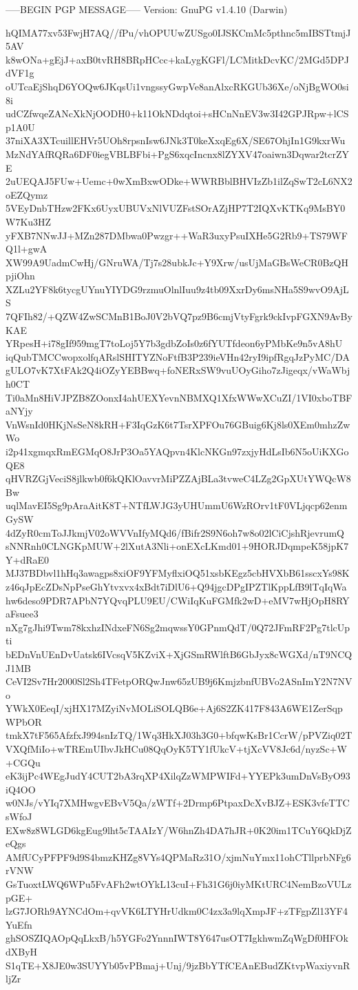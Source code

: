 -----BEGIN PGP MESSAGE-----
Version: GnuPG v1.4.10 (Darwin)

hQIMA77xv53FwjH7AQ//fPu/vhOPUUwZUSgo0IJSKCmMc5pthnc5mIBSTtmjJ5AV
k8wONa+gEjJ+axB0tvRH8BRpHCcc+kaLygKGFl/LCMitkDcvKC/2MGd5DPJdVF1g
oUTcaEjShqD6YOQw6JKqsUi1vngssyGwpVe8anAlxcRKGUb36Xe/oNjBgWO0si8i
udCZfwqeZANcXkNjOODH0+k11OkNDdqtoi+sHCnNnEV3w3I42GPJRpw+lCSp1A0U
37niXA3XTcuillEHVr5UOh8rpsnIsw6JNk3T0keXxqEg6X/SE67OhjIn1G9kxrWu
MzNdYAfRQRa6DF0iegVBLBFbi+PgS6xqcIncnx8lZYXV47oaiwn3Dqwar2tcrZYE
2uUEQAJ5FUw+Uemc+0wXmBxwODke+WWRBblBHVIzZb1ilZqSwT2cL6NX2oEZQymz
5VEyDnbTHzw2FKx6UyxUBUVxNlVUZFstSOrAZjHP7T2IQXvKTKq9MsBY0W7Ku3HZ
yFXB7NNwJJ+MZn287DMbwa0Pwzgr++WaR3uxyPsuIXHe5G2Rb9+TS79WFQ1l+gwA
XW99A9UadmCwHj/GNruWA/Tj7s28ubkJc+Y9Xrw/usUjMaGBsWeCR0BzQHpjiOhn
XZLu2YF8k6tycgUYnuYIYDG9rzmuOlnlIuu9z4tb09XxrDy6msNHa5S9wvO9AjLS
7QFIh82/+QZW4ZwSCMnB1BoJ0V2bVQ7pz9B6cmjVtyFgrk9ckIvpFGXN9AvByKAE
YRpesH+i78gIf959mgT7toLoj5Y7b3gdbZoIs0z6fYUTfdeon6yPMbKe9n5vA8hU
iqQubTMCCwopxolfqARslSHITYZNoFtfB3P239ieVHn42ryI9ipfRgqJzPyMC/DA
gULO7vK7XtFAk2Q4iOZyYEBBwq+foNERxSW9vuUOyGiho7zJigeqx/vWaWbjh0CT
Ti0aMn8HiVJPZB8ZOonxI4ahUEXYevnNBMXQ1XfxWWwXCuZI/1VI0xboTBFaNYjy
VnWsnId0HKjNsSeN8kRH+F3IqGzK6t7TsrXPFOu76GBuig6Kj8ls0XEm0mhzZwWo
i2p41xgmqxRmEGMqO8JrP3Oa5YAQpvn4KlcNKGn97zxjyHdLsIb6N5oUiKXGoQE8
qHVRZGjVeciS8jlkwb0f6kQKlOavvrMiPZZAjBLa3tvweC4LZg2GpXUtYWQcW8Bw
uqlMavEI5Sg9pAraAitK8T+NTfLWJG3yUHUmmU6WzROrv1tF0VLjqcp62enmGySW
4dZyR0cmToJJkmjV02oWVVnIfyMQd6/fBifr2S9N6oh7w8o02lCiCjshRjevrumQ
sNNRnh0CLNGKpMUW+2lXutA3Nli+onEXcLKmd01+9HORJDqmpeK58jpK7Y+dRaE0
MJ37BDbvl1hHq3awagps8xiOF9YFMyflxiOQ51xsbKEgz5cbHVXbB61sscxYs98K
z46qJpEcZDsNpPseGhYtvxvx4xBdt7iDlU6+Q94jgcDPgIPZTlKppLfB9lTqIqWa
hw6deso9PDR7APbN7YQvqPLU9EU/CWiIqKuFGMfk2wD+eMV7wHjOpH8RYaFsuee3
nXg7gJhi9Twm78kxhzINdxeFN6Sg2mqwssY0GPnmQdT/0Q72JFmRF2Pg7tlcUpti
bEDnVnUEnDvUatsk6IVcsqV5KZviX+XjGSmRWlftB6GbJyx8cWGXd/nT9NCQJ1MB
CeVI2Sv7Hr2000Sl2Sh4TFetpORQwJnw65zUB9j6KmjzbnfUBVo2ASnImY2N7NVo
YWkX0EeqI/xjHX17MZyiNvMOLiSOLQB6e+Aj6S2ZK417F843A6WE1ZerSqpWPbOR
tmkX7tF565AfzfxJ994snIzTQ/1Wq3HkXJ03h3G0+bfqwKsBr1CcrW/pPVZiq02T
VXQfMiIo+wTREmUIbvJkHCu08QqOyK5TY1fUkcV+tjXcVV8Jc6d/nyzSc+W+CGQu
eK3ijPc4WEgJudY4CUT2bA3rqXP4XilqZzWMPWIFd+YYEPk3umDnVsByO93iQ4OO
w0NJs/vYIq7XMHwgvEBvV5Qa/zWTf+2Drmp6PtpaxDcXvBJZ+ESK3vfeTTCsWfoJ
EXw8z8WLGD6kgEug9lht5cTAAIzY/W6hnZh4DA7hJR+0K20im1TCuY6QkDjZeQgs
AMfUCyPFPF9d9S4bmzKHZg8VYs4QPMaRz31O/xjmNuYmx11ohCTllprbNFg6rVNW
GsTuoxtLWQ6WPu5FvAFh2wtOYkL13cuI+Fh31G6j0iyMKtURC4NemBzoVULzpGE+
lzG7JORh9AYNCdOm+qvVK6LTYHrUdkm0C4zx3a9lqXmpJF+zTFgpZl13YF4YuEfn
ghSOSZIQAOpQqLkxB/h5YGFo2YnnnIWT8Y647usOT7IgkhwmZqWgDf0HFOkdXByH
S1qTE+X8JE0w3SUYYb05vPBmaj+Unj/9jzBbYTfCEAnEBudZKtvpWaxiyvnRljZr
